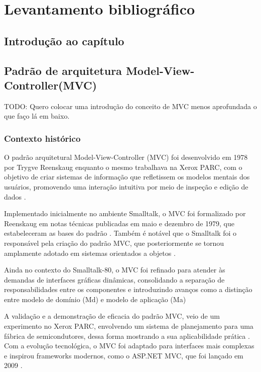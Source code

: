 \chapter{Levantamento bibliográfico}
\section{Introdução ao capítulo}


\section{Padrão de arquitetura Model-View-Controller(MVC)}
    \par TODO: Quero colocar uma introdução do conceito de MVC menos aprofundada o que faço lá em baixo.
    
    \subsection{Contexto histórico}
    
        \par O padrão arquitetural Model-View-Controller (MVC) foi desenvolvido em 1978 por Trygve Reenskaug enquanto o mesmo trabalhava na Xerox PARC, com o objetivo de criar sistemas de informação que refletissem os modelos mentais dos usuários, promovendo uma interação intuitiva por meio de inspeção e edição de dados \cite[p.~1]{artigo:reenskaug:2003}. 
        
        \par Implementado inicialmente no ambiente Smalltalk, o MVC foi formalizado por Reenskaug em notas técnicas publicadas em maio e dezembro de 1979, que estabeleceram as bases do padrão \cite{artigo:reenskaug:1979}. Também é notável  que o Smalltalk foi o responsável pela criação do padrão MVC, que posteriormente se tornou amplamente adotado em sistemas orientados a objetos \cite{artigo:deacon:2009}.
        
        Ainda no contexto do Smalltalk-80, o MVC foi refinado para atender às demandas de interfaces gráficas dinâmicas, consolidando a separação de responsabilidades entre os componentes e introduzindo avanços como a distinção entre modelo de domínio (Md) e modelo de aplicação (Ma) \cite{artigo:deacon:2009}

        A validação e a demonstração de eficacia do padrão MVC, veio de um experimento no Xerox PARC, envolvendo um sistema de planejamento para uma fábrica de semicondutores, dessa forma 
        mostrando a sua aplicabilidade prática \cite{artigo:reenskaug:2003}. Com a evolução tecnológica, o MVC foi adaptado para interfaces mais complexas e inspirou frameworks modernos, como o ASP.NET MVC, que foi lançado em 2009 \cite{artigo:deacon:2009}.
        
